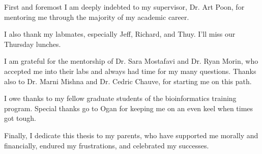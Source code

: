 First and foremost I am deeply indebted to my supervisor, Dr. Art Poon, 
for mentoring me through the majority of my academic career. 

I also thank my labmates, especially Jeff, Richard, and Thuy. I'll miss our
Thursday lunches.

I am grateful for the mentorship of Dr. Sara Mostafavi and Dr. Ryan Morin, who
accepted me into their labs and always had time for my many questions.  Thanks
also to Dr. Marni Mishna and Dr. Cedric Chauve, for starting me on this path.

I owe thanks to my fellow graduate students of the bioinformatics training
program. Special thanks go to Ogan for keeping me on an even keel when times
got tough.

Finally, I dedicate this thesis to my parents, who have supported me morally
and financially, endured my frustrations, and celebrated my successes.
